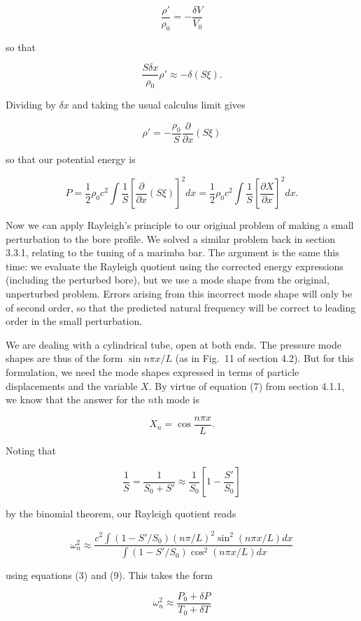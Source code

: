   $$\dfrac{\rho'}{\rho_0}=-\dfrac{\delta V}{V_0} \tag{6}$$ 

  so that 

  $$\dfrac{S \delta x}{\rho_0}\rho' \approx -\delta(S \xi) . \tag{7}$$ 

  Dividing by $\delta x$ and taking the usual calculus limit gives 

  $$\rho'=-\dfrac{\rho_0}{S}\dfrac{\partial}{\partial x}(S \xi) \tag{8}$$ 

  so that our potential energy is 

  $$P=\dfrac{1}{2} \rho_0 c^2 \int{\dfrac{1}{S}\left[\dfrac{\partial}{\partial 
  x}(S \xi)\right]^2 dx}=\dfrac{1}{2} \rho_0 c^2 
  \int{\dfrac{1}{S}\left[\dfrac{\partial X}{\partial x}\right]^2 dx} . 
  \tag{9}$$ 

  Now we can apply Rayleigh's principle to our original problem of making a 
  small perturbation to the bore profile. We solved a similar problem back in 
  section 3.3.1, relating to the tuning of a marimba bar. The argument is the 
  same this time: we evaluate the Rayleigh quotient using the corrected energy 
  expressions (including the perturbed bore), but we use a mode shape from the 
  original, unperturbed problem. Errors arising from this incorrect mode shape 
  will only be of second order, so that the predicted natural frequency will be 
  correct to leading order in the small perturbation. 

  We are dealing with a cylindrical tube, open at both ends. The pressure mode 
  shapes are thus of the form $\sin n \pi x/L$ (as in Fig.\ 11 of section 4.2). 
  But for this formulation, we need the mode shapes expressed in terms of 
  particle displacements and the variable $X$. By virtue of equation (7) from 
  section 4.1.1, we know that the answer for the $n\mathrm{th}$ mode is 

  $$X_n=\cos \dfrac{n \pi x}{L} . \tag{10}$$ 

  Noting that 

  $$\dfrac{1}{S}=\dfrac{1}{S_0+S'} \approx 
  \dfrac{1}{S_0}\left[1-\dfrac{S'}{S_0}\right] \tag{11}$$ 

  by the binomial theorem, our Rayleigh quotient reads 

  $$\omega_n^2 \approx \dfrac{c^2 \int{(1-S'/S_0)(n \pi/L)^2 \sin^2(n \pi x/L) 
  dx}}{\int{(1-S'/S_0) \cos^2(n \pi x/L) dx}} \tag{12}$$ 

  using equations (3) and (9). This takes the form 

  $$\omega_n^2 \approx \dfrac{P_0 + \delta P}{T_0 + \delta T} \tag{13}$$ 

